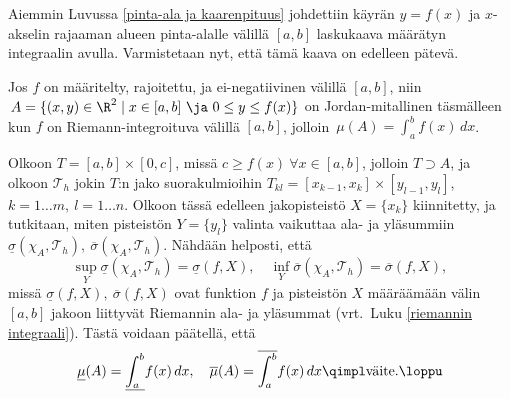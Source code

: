 Aiemmin Luvussa \ref{pinta-ala ja kaarenpituus} johdettiin käyrän $y=f(x)$ ja $x$-akselin
rajaaman alueen pinta-alalle välillä $[a,b]$ laskukaava määrätyn integraalin avulla.
Varmistetaan nyt, että tämä kaava on edelleen pätevä.
\begin{Lause} Jos $f$ on määritelty, rajoitettu, ja ei-negatiivinen välillä $[a,b]$, niin
$\,A = \{(x,y) \in \R^2 \mid x \in [a,b]\ \ja\ 0 \le y \le f(x)\}$
on Jordan-mitallinen täsmälleen kun $f$ on Riemann-integroituva välillä $[a,b]$, jolloin
$\,\mu(A)=\int_a^b f(x)\,dx$.
\end{Lause}
\tod Olkoon $T = [a,b] \times [0,c]$, missä $c \ge f(x)\ \forall x \in [a,b]$, jolloin 
$T \supset A$, ja olkoon $\mathcal{T}_h$ jokin $T$:n jako suorakulmioihin 
$T_{kl} = [x_{k-1},x_k] \times [y_{l-1},y_l]$, $k = 1 \ldots m,\ l = 1 \ldots n$. Olkoon tässä 
edelleen jakopisteistö $X = \{x_k\}$ kiinnitetty, ja tutkitaan, miten pisteistön $Y = \{y_l\}$ 
valinta vaikuttaa ala- ja yläsummiin 
$\underline{\sigma}(\chi_A,\mathcal{T}_h),\ \overline{\sigma}(\chi_A,\mathcal{T}_h)$. Nähdään
helposti, että
\[ 
\sup_Y \underline{\sigma}(\chi_A,\mathcal{T}_h) = \underline{\sigma}(f,X), \quad 
\inf_Y \overline{\sigma}(\chi_A,\mathcal{T}_h) = \overline{\sigma}(f,X), 
\]
missä $\underline{\sigma}(f,X),\ \overline{\sigma}(f,X)$ ovat funktion $f$ ja pisteistön $X$
määräämään välin $[a,b]$ jakoon liittyvät Riemannin ala- ja yläsummat
(vrt.\ Luku \ref{riemannin integraali}). Tästä voidaan päätellä, että
\[ 
\underline{\mu}(A) = \underline{\int_a^b} f(x)\,dx, \quad 
\overline{\mu}(A) = \overline{\int_a^b} f(x)\,dx \qimpl \text{väite.} \loppu 
\]